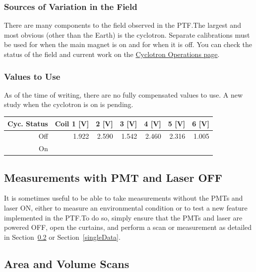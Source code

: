 \documentclass[twoside,letterpaper]{refart}
\begin{document}
\FloatBarrier


\subsubsection{Sources of Variation in the Field}

There are many components to the field observed in the PTF.\@ The largest and most obvious (other than the Earth) is the cyclotron. Separate calibrations must be used for when the main magnet is on and for when it is off. You can check the status of the field and current work on the \href{https://cycops.triumf.ca/}{Cyclotron Operations page}.

\subsubsection{Values to Use}

As of the time of writing, there are no fully compensated values to use. A new study when the cyclotron is on is pending.

\FloatBarrier

\begin{table}[htb!]\centering
	\begin{tabular}{rrrrrrr}
		\textbf{Cyc. Status} & \textbf{Coil 1} [V] & \textbf{2} [V] & \textbf{3} [V] & \textbf{4} [V] & \textbf{5} [V] & \textbf{6} [V] \\\toprule
		Off & 1.922 & 2.590 & 1.542 & 2.460 & 2.316 & 1.005 \\
		On & \\\bottomrule
	\end{tabular}
\end{table}

\FloatBarrier


\subsection{Measurements with PMT and Laser OFF}

It is sometimes useful to be able to take measurements without the PMTs and laser ON, either to measure an environmental condition or to test a new feature implemented in the PTF.\@ To do so, simply ensure that the PMTs and laser are powered OFF, open the curtains, and perform a scan or measurement as detailed in Section~\ref{AreaScan} or Section~\ref{singleData}.


\subsection{Area and Volume Scans}\label{AreaScan}
\end{document}
